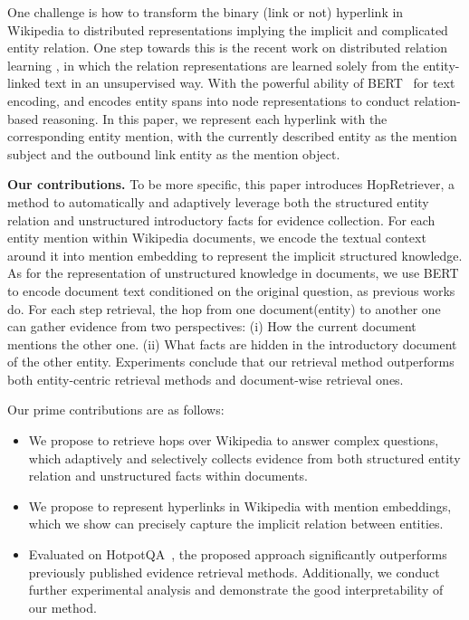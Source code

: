 \documentclass[letterpaper]{article} \usepackage{aaai21}  \usepackage{times}  \usepackage{helvet} \usepackage{courier}  \usepackage[hyphens]{url}  \usepackage{graphicx} \urlstyle{rm} \def\UrlFont{\rm}  \usepackage{graphicx}  \usepackage{natbib}  \usepackage{caption} \frenchspacing  \setlength{\pdfpagewidth}{8.5in}  \setlength{\pdfpageheight}{11in}
\begin{document}
One challenge is how to transform the binary (link or not) hyperlink in Wikipedia to distributed representations implying the implicit and complicated entity relation. One step towards this is the recent work on distributed relation learning \cite{matching-the-blanks}, in which the relation representations are learned solely from the entity-linked text in an unsupervised way. With the powerful ability of BERT~\cite{BERT} for text encoding, \citep{CogQA} and \cite{DrKIT} encodes entity spans into node representations to conduct relation-based reasoning. In this paper, we represent each hyperlink with the corresponding entity mention, with the currently described entity as the mention subject and the outbound link entity as the mention object.

\textbf{Our contributions.} To be more specific, this paper introduces HopRetriever, a method to automatically and adaptively leverage both the structured entity relation and unstructured introductory facts for evidence collection. For each entity mention within Wikipedia documents, we encode the textual context around it into mention embedding to represent the implicit structured knowledge. As for the representation of unstructured knowledge in documents, we use BERT to encode document text conditioned on the original question, as previous works do. For each step retrieval, the hop from one document(entity) to another one can gather evidence from two perspectives: (i) How the current document mentions the other one. (ii) What facts are hidden in the introductory document of the other entity. Experiments conclude that our retrieval method outperforms both entity-centric retrieval methods and document-wise retrieval ones. 


Our prime contributions are as follows: 
\begin{itemize}
\item We propose to retrieve hops over Wikipedia to answer complex questions, which adaptively and selectively collects evidence from both structured entity relation and unstructured facts within documents. 

\item We propose to represent hyperlinks in Wikipedia with mention embeddings, which we show can precisely capture the implicit relation between entities. 

\item Evaluated on HotpotQA~\cite{hotpot-qa-dataset}, the proposed approach significantly outperforms previously published evidence retrieval methods. Additionally, we conduct further experimental analysis and demonstrate the good interpretability of our method.

\end{itemize}
\end{document}
